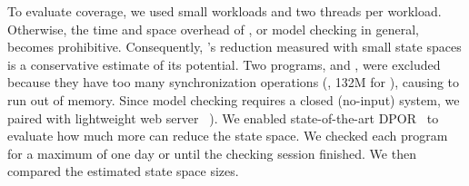 


To evaluate coverage, we used small workloads and two threads per workload.
Otherwise, the time and space overhead of \dbug,
or model checking in general, becomes prohibitive. Consequently, \parrot's
reduction measured with small state spaces is a conservative estimate of
its potential.  Two programs, \volrend and \ua, were excluded because they
have too many synchronization operations (\eg, 132M for \ua), causing
\dbug to run out of memory.  Since model checking requires a closed
(no-input) system, we paired \aget with lightweight web server
\mongoose~\cite{mongoose}).  We enabled
state-of-the-art DPOR~\cite{flanagan:dynamicpo} to evaluate how much more
\parrot can reduce the state space. We checked each program for a maximum of
one day or until the checking session finished.  We then compared the
estimated state space sizes.








